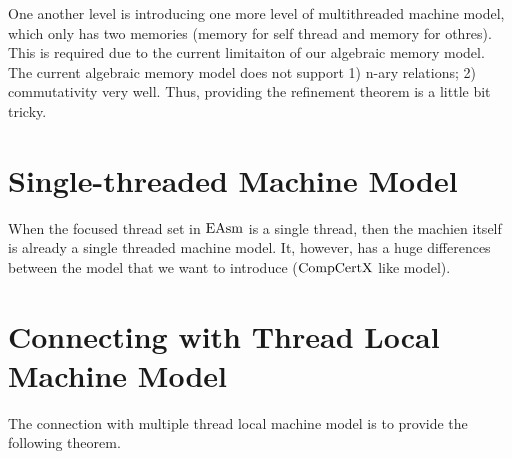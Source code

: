 One another level is introducing one more level of multithreaded machine model,
which only has two memories (memory for self thread and memory for othres).
This is required due to the current limitaiton of our algebraic memory model. 
The current algebraic memory model does not support 
1) n-ary relations; 2) commutativity very well. 
Thus, providing the refinement theorem is a little bit tricky. 


\section{Single-threaded Machine Model}
\label{chapter:linking:subsec:single-threaded-machine-model}
When the focused thread set in $\mathrm{EAsm}$ is a single thread, then the machien itself is 
already a single threaded machine model. 
It, however, has a huge differences between the model that we want to introduce ($\mathrm{CompCertX}$ like model).

\section{Connecting with Thread Local Machine Model}
\label{chapter:linking:subsec:connecting-with-thread-local-machine-model}

The connection with multiple thread local machine model is to provide the  following theorem. 
